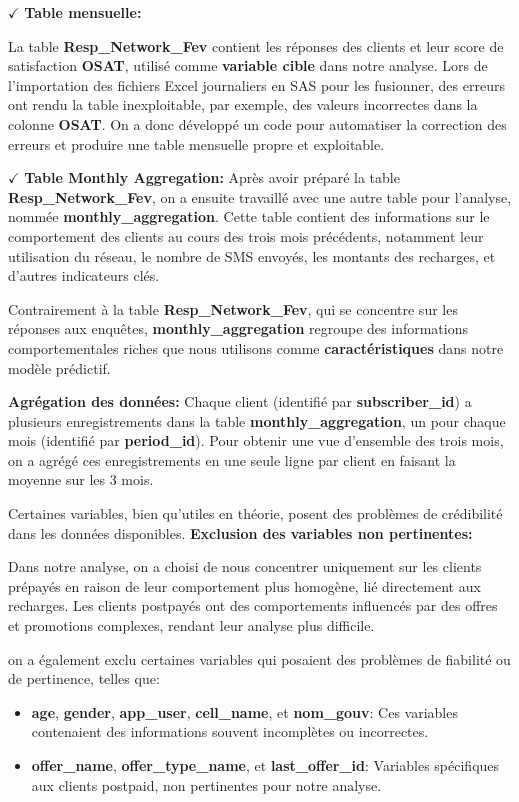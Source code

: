 \noindent \textbf{\(\checkmark\)} \textbf{Table mensuelle:}

La table \textbf{Resp\_Network\_Fev} contient les réponses des clients et leur score de satisfaction \textbf{OSAT}, utilisé comme \textbf{variable cible} dans notre analyse. Lors de l'importation des fichiers Excel journaliers en SAS pour les fusionner, des erreurs ont rendu la table inexploitable, par exemple, des valeurs incorrectes dans la colonne \textbf{OSAT}. On a donc développé un code pour automatiser la correction des erreurs et produire une table mensuelle propre et exploitable.


\noindent \textbf{\(\checkmark\)} \textbf{Table Monthly Aggregation:} Après avoir préparé la table \textbf{Resp\_Network\_Fev}, on a ensuite travaillé avec une autre table pour l'analyse, nommée \textbf{monthly\_aggregation}. Cette table contient des informations sur le comportement des clients au cours des trois mois précédents, notamment leur utilisation du réseau, le nombre de SMS envoyés, les montants des recharges, et d'autres indicateurs clés. 

Contrairement à la table \textbf{Resp\_Network\_Fev}, qui se concentre sur les réponses aux enquêtes, \textbf{monthly\_aggregation} regroupe des informations comportementales riches que nous utilisons comme \textbf{caractéristiques} dans notre modèle prédictif.


\noindent \textbf{\checkmark Agrégation des données:} Chaque client (identifié par \textbf{subscriber\_id}) a plusieurs enregistrements dans la table \textbf{monthly\_aggregation}, un pour chaque mois (identifié par \textbf{period\_id}). Pour obtenir une vue d'ensemble des trois mois, on a agrégé ces enregistrements en une seule ligne par client en faisant la moyenne sur les 3 mois.


Certaines variables, bien qu'utiles en théorie, posent des problèmes de crédibilité dans les données disponibles.
\noindent \textbf{\checkmark Exclusion des variables non pertinentes:}

Dans notre analyse, on a choisi de nous concentrer uniquement sur les clients prépayés en raison de leur comportement plus homogène, lié directement aux recharges. Les clients postpayés ont des comportements influencés par des offres et promotions complexes, rendant leur analyse plus difficile.

on a également exclu certaines variables qui posaient des problèmes de fiabilité ou de pertinence, telles que:
\begin{itemize}
    \item \textbf{age}, \textbf{gender}, \textbf{app\_user}, \textbf{cell\_name}, et \textbf{nom\_gouv}: Ces variables contenaient des informations souvent incomplètes ou incorrectes.
    \item \textbf{offer\_name}, \textbf{offer\_type\_name}, et \textbf{last\_offer\_id}: Variables spécifiques aux clients postpaid, non pertinentes pour notre analyse.
\end{itemize}

